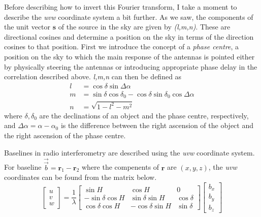 Before describing how to invert this Fourier transform, I take a moment to describe the \textit{uvw} coordinate system a bit further.
As we saw, the components of the unit vector $\mathbf{s}$ of the source in the sky are given by \textit{(l,m,n)}. These are directional cosines and determine a position on the sky in terms of the direction cosines to that position. First we introduce the concept of a \textit{phase centre}, a position on the sky to which the main response of the antennas is pointed either by physically steering the antennas or introducing appropriate phase delay in the correlation described above.
\textit{l,m,n} can then be defined as
\begin{align*}
l &= \cos \delta  \sin \Delta \alpha \\ 
m &= \sin \delta \cos \delta_0 - \cos \delta \sin \delta_0 \cos\Delta \alpha \\ 
n &= \sqrt{1-l^2-m^2}
\end{align*}
where $\delta, \delta_0$ are the declinations of an object and the phase centre, respectively, and $\Delta \alpha = \alpha -\alpha_0$ is the difference between the right ascension of the object and the right ascension of the phase centre.

Baselines in radio interferometry are described using the \textit{uvw} coordinate system. For baseline $\overrightarrow{\Vec{b}} = \mathbf{r}_1 - \mathbf{r}_2$ where the compenents of $\mathbf{r}$ are $(x,y,z)$, the \textit{uvw} coordinates can be found from the matrix below.
\[
\begin{bmatrix}
    u \\
    v \\
    w
\end{bmatrix}
=
\dfrac{1}{\lambda}
\begin{bmatrix}
    \sin H       & \cos H & 0 \\
    -\sin \delta \cos H       & \sin \delta \sin H & \cos \delta \\
    \cos \delta \cos H       & -\cos \delta \sin H & \sin \delta
    

\end{bmatrix}
%
\begin{bmatrix}
    b_x \\
    b_y \\
    b_z
    

\end{bmatrix}
\]

